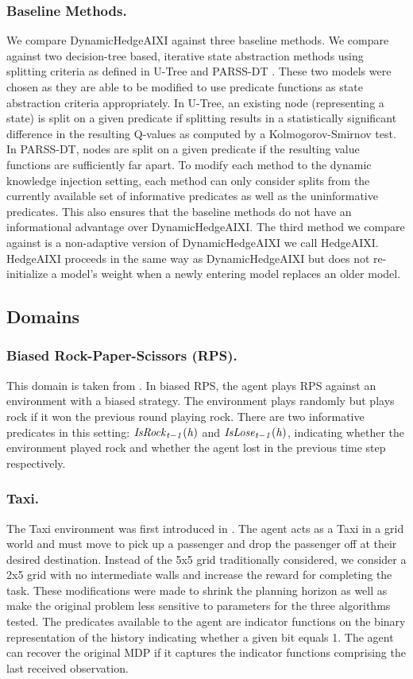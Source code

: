 \documentclass[letterpaper]{article} %
\theoremstyle{definition}
\begin{document}
\subsubsection{Baseline Methods.} We compare DynamicHedgeAIXI against three baseline methods. We compare against two decision-tree based, iterative state abstraction methods using splitting criteria as defined in U-Tree \cite{McC96} and PARSS-DT \cite{HFD17}. These two models were chosen as they are able to be modified to use predicate functions as state abstraction criteria appropriately. In U-Tree, an existing node (representing a state) is split on a given predicate if splitting results in a statistically significant difference in the resulting Q-values as computed by a Kolmogorov-Smirnov test. In PARSS-DT, nodes are split on a given predicate if the resulting value functions are sufficiently far apart. To modify each method to the dynamic knowledge injection setting, each method can only consider splits from the currently available set of informative predicates as well as the uninformative predicates. This also ensures that the baseline methods do not have an informational advantage over DynamicHedgeAIXI. The third method we compare against is a non-adaptive version of DynamicHedgeAIXI we call HedgeAIXI. HedgeAIXI proceeds in the same way as DynamicHedgeAIXI but does not re-initialize a model's weight when a newly entering model replaces an older model. 

\subsection{Domains}

\subsubsection{Biased Rock-Paper-Scissors (RPS).}
This domain is taken from \cite{FMVRW07}. In biased RPS, the agent plays RPS against an environment with a biased strategy. The environment plays randomly but plays rock if it won the previous round playing rock. There are two informative predicates in this setting: $\it{IsRock}_{t-1}(h)$ and $\it{IsLose}_{t-1}(h)$, indicating whether the environment played rock and whether the agent lost in the previous time step respectively. 

\subsubsection{Taxi.}
The Taxi environment was first introduced in \cite{DI99}. The agent acts as a Taxi in a grid world and must move to pick up a passenger and drop the passenger off at their desired destination. Instead of the 5x5 grid traditionally considered, we consider a 2x5 grid with no intermediate walls and increase the reward for completing the task. These modifications were made to shrink the planning horizon as well as make the original problem less sensitive to parameters for the three algorithms tested.
The predicates available to the agent are indicator functions on the binary representation of the history indicating whether a given bit equals 1. 
The agent can recover the original MDP if it captures the indicator functions  comprising the last received observation.
\end{document}
